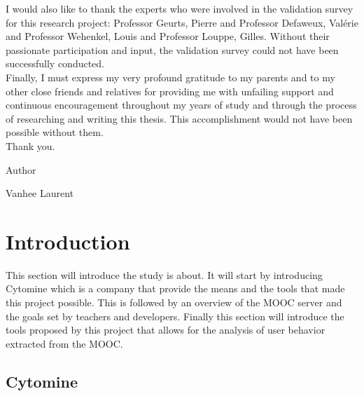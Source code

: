 \documentclass[a4paper,11pt]{report}
\numberwithin{figure}{chapter} %
\begin{document}
I would also like to thank the experts who were involved in the validation survey for this research project: Professor Geurts, Pierre and Professor Defaweux, Val\'{e}rie and Professor Wehenkel, Louis and Professor Louppe, Gilles.
Without their passionate participation and input, the validation survey could not have been successfully conducted.\\


Finally, I must express my very profound gratitude to my parents and to my other close friends and relatives for providing me with unfailing support and continuous encouragement throughout my years of study and through the process of researching and writing this thesis.
This accomplishment would not have been possible without them.\\
Thank you.

\vspace{1cm}

\noindent Author

\vspace{1cm}

\noindent Vanhee Laurent

\chapter{Introduction}

This section will introduce the study is about.
It will start by introducing Cytomine which is a company that provide the means and the tools that made this project possible.
This is followed by an overview of the MOOC server and the goals set by teachers and developers.
Finally this section will introduce the tools proposed by this project that allows for the analysis of user behavior extracted from the MOOC.

\section{Cytomine}
\end{document}
